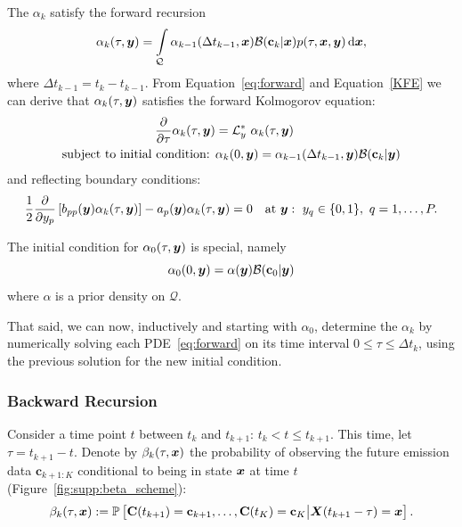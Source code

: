 \documentclass{article}
\def\x{\mbox{\boldmath $x$}}
\def\y{\mbox{\boldmath $y$}}
\def\X{\mbox{\boldmath $X$}}
\def\calB{{\mathcal B}}
\def\calL{{\mathcal L}}
\def\calQ{{\mathcal Q}}
\def\P{\mathbb{P}}
\begin{document}
The $\alpha_k$ satisfy the forward recursion
\begin{equation}\label{eq:forward}
\alpha_k(\tau,\y) = \int\limits_\calQ \alpha_{k-1}(\Delta t_{k-1},\x) \calB(\mathbf{c}_k | \x) p(\tau,\x,\y) \,\rm{d}\x,
\end{equation}
where $\Delta t_{k-1}=t_k - t_{k-1}$.
From Equation~\ref{eq:forward} and Equation~\ref{KFE} we can derive that $\alpha_k(\tau,\y)$ satisfies the forward Kolmogorov equation:
\begin{align}
\frac{\partial}{\partial \tau}\alpha_k(\tau,\y) &=  \calL_y^* \ \alpha_k(\tau,\y) \label{KFEalpha}\\
\text{subject to initial condition: } & \alpha_k(0,\y)=\alpha_{k-1}(\Delta t_{k-1},\y) \calB(\mathbf{c}_k | \y)
\label{initial_alpha}
\end{align}
and reflecting boundary conditions:
\begin{equation*}
\frac{1}{2} \frac{\partial}{\partial y_p} \left[b_{pp}(\y)\alpha_k(\tau,\y)\right] - a_p(\y) \alpha_k(\tau,\y) = 0 \quad \text{at } \y:\ y_q \in \{0, 1\}, \ q=1,\ldots, P.
\end{equation*}

\bigskip

The initial condition for $\alpha_0(\tau,\y)$ is special, namely
\begin{equation}\label{alpha_0}
\alpha_0(0,\y)=\alpha(\y) \calB(\mathbf{c}_0 | \y)
\end{equation}
where $\alpha$ is a prior density on $\calQ$.

\bigskip

That said, we can now, inductively and starting with $\alpha_0$, determine the $\alpha_k$ by numerically solving each PDE~\ref{eq:forward} on its time interval $0\leq\tau\leq \Delta t_k$, using the previous solution for the new initial condition.


\subsubsection{Backward Recursion}

Consider a time point $t$ between $t_k$ and $t_{k+1}$: $t_k < t \leq t_{k+1}$. This time, let $\tau=t_{k+1}-t$. Denote by $\beta_k(\tau,\x)$ the probability of observing the future emission data $\mathbf{c}_{k+1:K}$ conditional to  being in state $\x$ at time $t$ (Figure~\ref{fig:supp:beta_scheme}):
\begin{equation*}
\beta_k(\tau,\x) := \P\left[ \mathbf{C}(t_{k+1})=\mathbf{c}_{k+1}, \ldots, \mathbf{C}(t_K)=\mathbf{c}_K \big| \X(t_{k+1}-\tau)=\x \right].
\end{equation*}
\end{document}
